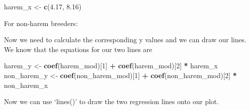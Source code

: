 \documentclass[
]{book}
\newenvironment{Shaded}{\begin{snugshade}}{\end{snugshade}}
\newcommand{\DecValTok}[1]{\textcolor[rgb]{0.00,0.00,0.81}{#1}}
\newcommand{\FloatTok}[1]{\textcolor[rgb]{0.00,0.00,0.81}{#1}}
\newcommand{\KeywordTok}[1]{\textcolor[rgb]{0.13,0.29,0.53}{\textbf{#1}}}
\newcommand{\NormalTok}[1]{#1}
\newcommand{\OperatorTok}[1]{\textcolor[rgb]{0.81,0.36,0.00}{\textbf{#1}}}
\newcommand{\StringTok}[1]{\textcolor[rgb]{0.31,0.60,0.02}{#1}}
\begin{document}
\begin{Shaded}
\begin{Highlighting}[]

\NormalTok{harem_x <-}\StringTok{ }\KeywordTok{c}\NormalTok{(}\FloatTok{4.17}\NormalTok{, }\FloatTok{8.16}\NormalTok{)}
\end{Highlighting}
\end{Shaded}

For non-harem breeders:

\begin{Shaded}
\end{Shaded}

Now we need to calculate the corresponding y values and we can draw our lines. We know that the equations for our two lines are

\begin{Shaded}
\begin{Highlighting}[]
\NormalTok{harem_y <-}\StringTok{ }\KeywordTok{coef}\NormalTok{(harem_mod)[}\DecValTok{1}\NormalTok{] }\OperatorTok{+}\StringTok{ }\KeywordTok{coef}\NormalTok{(harem_mod)[}\DecValTok{2}\NormalTok{] }\OperatorTok{*}\StringTok{ }\NormalTok{harem_x}
\NormalTok{non_harem_y <-}\StringTok{ }\KeywordTok{coef}\NormalTok{(non_harem_mod)[}\DecValTok{1}\NormalTok{] }\OperatorTok{+}\StringTok{ }\KeywordTok{coef}\NormalTok{(non_harem_mod)[}\DecValTok{2}\NormalTok{] }\OperatorTok{*}\StringTok{ }\NormalTok{non_harem_x}
\end{Highlighting}
\end{Shaded}

Now we can use `lines()' to draw the two regression lines onto our plot.
\end{document}
